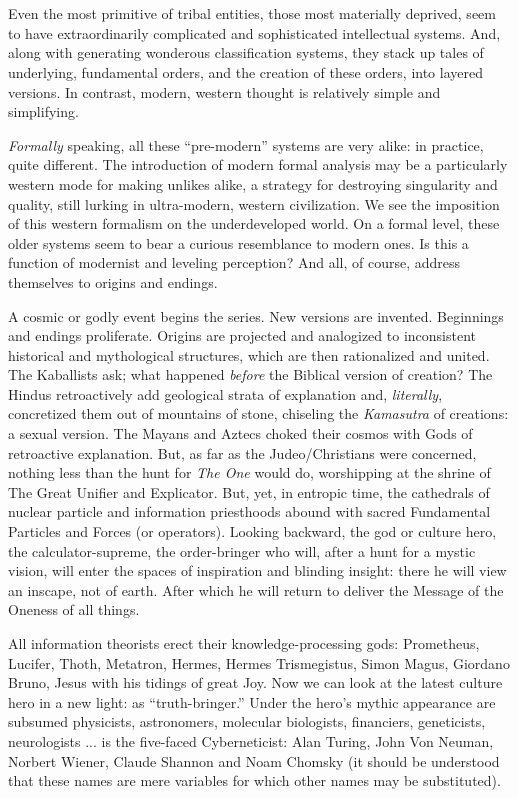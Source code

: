 \chapter{}

Even the most primitive of tribal entities,
those most materially deprived, seem to
have extraordinarily complicated and sophisticated intellectual systems. And, along with
generating wonderous classification systems,
they stack up tales of underlying, fundamental orders, and the creation of these orders,
into layered versions. In contrast, modern, western thought is relatively simple and
simplifying. 

\emph{Formally} speaking, all these \enquote{pre-modern}
systems are very alike: in practice, quite different. 
The introduction of modern formal analysis may be a particularly western
mode for making unlikes alike, a strategy for
destroying singularity and quality, still lurking in ultra-modern,
western civilization. We see the imposition of this western 
formalism on the underdeveloped world. On a
formal level, these older systems seem to
bear a curious resemblance to modern ones.
Is this a function of modernist and leveling
perception? And all, of course, address
themselves to origins and endings.

A cosmic or godly event begins the series.
New versions are invented. Beginnings and
endings proliferate. Origins are projected
and analogized to inconsistent historical
and mythological structures, which are then
rationalized and united. The Kaballists ask;
what happened \emph{before} the Biblical version of
creation? The Hindus retroactively add geological strata of explanation and, \emph{literally},
concretized them out of mountains of stone,
chiseling the \emph{Kamasutra} of creations:
a sexual version. The Mayans and Aztecs choked
their cosmos with Gods of retroactive explanation.
But, as far as the Judeo\slash Christians
were concerned, nothing less than the hunt
for \emph{The One} would do, worshipping at the
shrine of The Great Unifier and Explicator.
But, yet, in entropic time, the cathedrals of
nuclear particle and information priesthoods
abound with sacred Fundamental Particles
and Forces (or operators). Looking backward,
the god or culture hero, the calculator-supreme, the order-bringer who will, after a
hunt for a mystic vision, will enter the
spaces of inspiration and blinding insight:
there he will view an inscape, not of earth.
After which he will return to deliver the
Message of the Oneness of all things.

All information theorists erect their knowledge-processing gods: Prometheus, Lucifer,
Thoth, Metatron, Hermes, Hermes Trismegistus, Simon Magus, Giordano Bruno, Jesus
with his tidings of great Joy. Now we can
look at the latest culture hero in a new light:
as \enquote{truth-bringer.} Under the hero's mythic
appearance are subsumed physicists, astronomers, 
molecular biologists, financiers, geneticists, neurologists ... is the five-faced
Cyberneticist: Alan Turing, John Von Neuman, Norbert Wiener, Claude Shannon and
Noam Chomsky (it should be understood that these names are mere variables for
which other names may be substituted).


